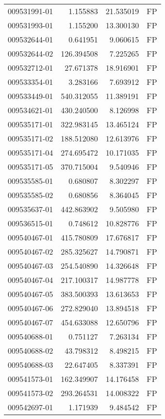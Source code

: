 \begin{tabular}{lrrl}
009531991-01 &    1.155883 &    21.535019 &   FP \\
009531993-01 &    1.155200 &    13.300130 &   FP \\
009532644-01 &    0.641951 &     9.060615 &   FP \\
009532644-02 &  126.394508 &     7.225265 &   FP \\
009532712-01 &   27.671378 &    18.916901 &   FP \\
009533354-01 &    3.283166 &     7.693912 &   FP \\
009533449-01 &  540.312055 &    11.389191 &   FP \\
009534621-01 &  430.240500 &     8.126998 &   FP \\
009535171-01 &  322.983145 &    13.465124 &   FP \\
009535171-02 &  188.512080 &    12.613976 &   FP \\
009535171-04 &  274.695472 &    10.171035 &   FP \\
009535171-05 &  370.715004 &     9.540946 &   FP \\
009535585-01 &    0.680807 &     8.302297 &   FP \\
009535585-02 &    0.680856 &     8.364045 &   FP \\
009535637-01 &  442.863902 &     9.505980 &   FP \\
009536515-01 &    0.748612 &    10.828776 &   FP \\
009540467-01 &  415.780809 &    17.676817 &   FP \\
009540467-02 &  285.325627 &    14.790871 &   FP \\
009540467-03 &  254.540890 &    14.326648 &   FP \\
009540467-04 &  217.100317 &    14.987778 &   FP \\
009540467-05 &  383.500393 &    13.613653 &   FP \\
009540467-06 &  272.829040 &    13.894518 &   FP \\
009540467-07 &  454.633088 &    12.650796 &   FP \\
009540688-01 &    0.751127 &     7.263134 &   FP \\
009540688-02 &   43.798312 &     8.498215 &   FP \\
009540688-03 &   22.647405 &     8.337391 &   FP \\
009541573-01 &  162.349907 &    14.176458 &   FP \\
009541573-02 &  293.264531 &    14.008322 &   FP \\
009542697-01 &    1.171939 &     9.484542 &   FP \\

\end{tabular}
